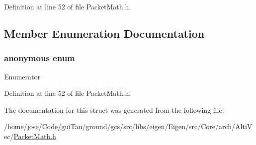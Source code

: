 Definition at line 52 of file Packet\-Math.\-h.



\subsection{Member Enumeration Documentation}
\hypertarget{structei__unpacket__traits_3_01v4i_01_4_aa13f397afef41088f154d3083d742cbf}{\subsubsection[{anonymous enum}]{\setlength{\rightskip}{0pt plus 5cm}anonymous enum}}\label{structei__unpacket__traits_3_01v4i_01_4_aa13f397afef41088f154d3083d742cbf}
\begin{Desc}
\item[Enumerator]\par
\begin{description}
\item[{\em 
\hypertarget{structei__unpacket__traits_3_01v4i_01_4_aa13f397afef41088f154d3083d742cbfa07f9c6d3fa3efda8f30b041d1a911a22}{size}\label{structei__unpacket__traits_3_01v4i_01_4_aa13f397afef41088f154d3083d742cbfa07f9c6d3fa3efda8f30b041d1a911a22}
}]\end{description}
\end{Desc}


Definition at line 52 of file Packet\-Math.\-h.



The documentation for this struct was generated from the following file\-:\begin{DoxyCompactItemize}
\item 
/home/jose/\-Code/gui\-Tau/ground/gcs/src/libs/eigen/\-Eigen/src/\-Core/arch/\-Alti\-Vec/\hyperlink{_alti_vec_2_packet_math_8h}{Packet\-Math.\-h}\end{DoxyCompactItemize}
